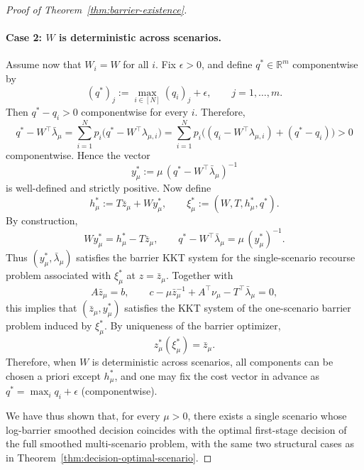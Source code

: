 \documentclass{article}
\newcommand{\R}{\mathbb{R}}
\theoremstyle{plain}
\theoremstyle{definition}
\theoremstyle{remark}
\begin{document}
\begin{proof}[Proof of Theorem~\ref{thm:barrier-existence}]
\paragraph{Case 2: $W$ is deterministic across scenarios.}
Assume now that $W_i=W$ for all $i$. Fix $\epsilon>0$, and define $q^*\in\R^m$ componentwise by
\[
(q^*)_j:=\max_{i\in[N]}(q_i)_j+\epsilon,
\qquad j=1,\dots,m.
\]
Then $q^*-q_i>0$ componentwise for every $i$. Therefore,
\[
q^*-W^\top\bar\lambda_\mu
=
\sum_{i=1}^N p_i\big(q^*-W^\top\lambda_{\mu,i}\big)
=
\sum_{i=1}^N p_i\big((q_i-W^\top\lambda_{\mu,i})+(q^*-q_i)\big)
>
0
\]
componentwise. Hence the vector
\[
y_\mu^*:=\mu\,(q^*-W^\top\bar\lambda_\mu)^{-1}
\]
is well-defined and strictly positive. Now define
\[
h_\mu^*:=T\bar z_\mu+Wy_\mu^*,
\qquad
\xi_\mu^*:=(W,T,h_\mu^*,q^*).
\]
By construction,
\[
Wy_\mu^*=h_\mu^*-T\bar z_\mu,
\qquad
q^*-W^\top\bar\lambda_\mu=\mu\,(y_\mu^*)^{-1}.
\]
Thus $(y_\mu^*,\bar\lambda_\mu)$ satisfies the barrier KKT system for the single-scenario recourse problem associated with $\xi_\mu^*$ at $z=\bar z_\mu$. Together with
\[
A\bar z_\mu=b,
\qquad
c-\mu\bar z_\mu^{-1}+A^\top\nu_\mu-T^\top\bar\lambda_\mu=0,
\]
this implies that $(\bar z_\mu,y_\mu^*)$ satisfies the KKT system of the one-scenario barrier problem induced by $\xi_\mu^*$. By uniqueness of the barrier optimizer,
\[
z_\mu^*(\xi_\mu^*)=\bar z_\mu.
\]
Therefore, when $W$ is deterministic across scenarios, all components can be chosen a priori except $h_\mu^*$, and one may fix the cost vector in advance as $q^*=\max_i q_i+\epsilon$ (componentwise).

We have thus shown that, for every $\mu>0$, there exists a single scenario whose log-barrier smoothed decision coincides with the optimal first-stage decision of the full smoothed multi-scenario problem, with the same two structural cases as in Theorem~\ref{thm:decision-optimal-scenario}.
\end{proof}
\end{document}
